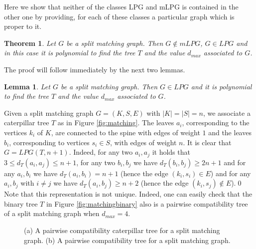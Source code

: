 \documentclass[dvipdfm]{llncs}
\newtheorem{Theorem}{Theorem}
\newtheorem{Lemma}{Lemma}
\newcommand{\dmax}{d_{max}}
\begin{document}
Here we show that neither of the classes LPG and mLPG is contained in the other one by providing, for each of these classes a particular graph which is proper to it. 

\begin{Theorem} \label{theo:splitmatching}
Let $G$ be a split matching graph. Then $G \not \in mLPG$, $G \in LPG$ and in this case it is polynomial to find the tree $T$ and the value $\dmax$ associated to $G$.
\end{Theorem}

The proof will follow immediately by the next two lemmas.

\begin{Lemma}\label{lem:matchingtree}
Let $G$ be a split matching graph. Then $G \in LPG$ and it is polynomial to find the tree $T$ and the value $\dmax$ associated to $G$.
\end{Lemma}
\proof
Given a split matching graph $G=(K,S,E)$ with $|K|=|S|=n$, we associate a caterpillar tree $T$ as in Figure \ref{fig:matching}. The leaves $a_i$, corresponding to the vertices $k_i$ of $K$, are connected to the spine with edges of weight $1$ and the leaves $b_i$, corresponding to vertices $s_i \in S$, with edges of weight $n$. It is clear that $G=LPG(T,n+1)$. Indeed, for any two $a_i, a_j$ it holds that $3\leq d_T(a_i,a_j)\leq n+1$, for any two $b_i, b_j$ we have $d_T(b_i,b_j)\geq 2n+1$ and for any $a_i, b_i$ we have $d_T(a_i,b_i)=n+1$ (hence the edge $(k_i,s_i) \in E$) and for any $a_i, b_j$ with $i\neq j$ we have $d_T(a_i,b_j) \geq n+2$ (hence the edge $(k_i,s_j) \not\in E$).\qed
Note that this representation is not unique. Indeed, one can easily check that the binary tree $T$ in Figure \ref{fig:matchingbinary} also is a pairwise compatibility tree of a split matching graph when $\dmax=4$. 

\begin{figure}[!ht]
  \begin{center}
  \end{center}
\caption{\footnotesize{(a) A pairwise compatibility caterpillar tree for a split matching graph. (b) A pairwise compatibility tree for a split matching graph.}}
\label{fig:mat}
\end{figure}
\end{document}
